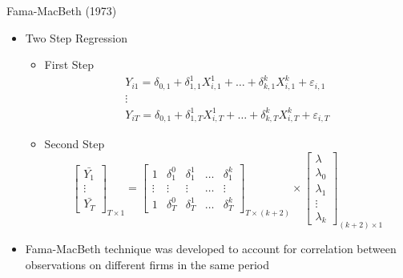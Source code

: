 \documentclass[handout]{beamer}
\begin{document}
	\begin{frame}{Fama-MacBeth (1973)}
		\begin{itemize}
			
			\item Two Step Regression
			\begin{itemize}
				\item First Step
				\begin{equation*}
					\begin{array}{c}
						Y_{i1} = \delta_{0,1} + \delta_{1,1}^1 X^1_{i,1} + \dots  + \delta_{k,1}^k X^k_{i,1}  + \varepsilon_{i,1}\\
						\vdots\\
						Y_{iT} = \delta_{0,1} + \delta_{1,T}^1 X^1_{i,T} + \dots  + \delta_{k,T}^k X^k_{i,T}  + \varepsilon_{i,T}
					\end{array}
				\end{equation*}
				
				
				
				\item Second Step
				\begin{equation*}
					\left[\begin{matrix}
						\bar{Y_1}\\
						\vdots\\
						\bar{Y_T}
					\end{matrix}\right]_{T\times 1} =
					\left[\begin{matrix}
						1 &  \delta_1^0 &  \delta_1^1 & \dots  &  \delta_1^k\\
						\vdots&  \vdots &  \vdots &  \dots &  \vdots\\
						1 &  \delta_T^0 &  \delta_T^1 & \dots &  \delta_T^k
					\end{matrix}\right]_{T\times (k+2)}
					\times \left[\begin{matrix}
						\lambda\\
						\lambda_0\\
						\lambda_1\\
						\vdots\\
						\lambda_k
					\end{matrix}\right] _{(k+2)\times 1}
				\end{equation*}
				
				
			\end{itemize}
			\item Fama-MacBeth technique was
			developed to account for correlation between observations on different firms in the same period
		\end{itemize}
	\end{frame}
	
\end{document}
